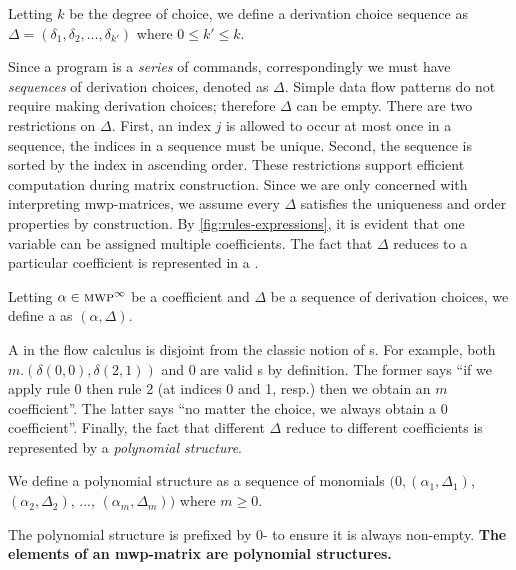 \begin{definition}
    Letting \(k\) be the degree of choice,
    we define a derivation choice sequence as \(\Delta = (\delta_1, \delta_2, \dots, \delta_{k'})\)
    where \(0 \leq k' \leq k \). %
\end{definition}
Since a program is a \emph{series} of commands, correspondingly we must have \emph{sequences} of derivation choices, denoted as \(\Delta\).
Simple data flow patterns do not require making derivation choices;
therefore \(\Delta\) can be empty.
There are two restrictions on \(\Delta\).
First, an index \(j\) is allowed to occur at most once in a sequence, \ie the indices in a sequence must be unique.
Second, the sequence is sorted by the index in ascending order.
These restrictions support efficient computation during matrix construction.
Since we are only concerned with {interpreting} mwp-matrices, we assume every \(\Delta\) satisfies the uniqueness and order properties by construction.
By \autoref{fig:rules-expressions}, it is evident that one variable can be assigned multiple coefficients.
The fact that \(\Delta\) reduces to a particular coefficient is represented in a \emph{}.

\begin{definition}[Monomial]\label{def:mono}
Letting \(\alpha \in \text{\textsc{mwp}}^\infty\) be a coefficient and \(\Delta\) be a sequence of derivation choices,
we define a  as \((\alpha, \Delta)\).
\end{definition}

\noindent
A  in the flow calculus is disjoint from the classic notion of s.
For example, both \(m.(\delta(0,0),\delta(2,1))\) and \(0\) are valid s by definition.
The former says \enquote{if we apply rule 0 then rule 2 (at indices 0 and 1, resp.) then we obtain an \(m\) coefficient}.
The latter says \enquote{no matter the choice, we always obtain a \(0\) coefficient}.
Finally, the fact that {different \(\Delta\)} reduce to {different coefficients} is represented by a \emph{polynomial structure}.

\begin{definition}
    We define a polynomial structure as a sequence of monomials
    \(\big(0,(\alpha_1,\Delta_1)\), \((\alpha_2,\Delta_2)\), \(\dots\), \((\alpha_m, \Delta_m)\big)\) where \(m \geq 0\).
\end{definition}

\noindent The polynomial structure is prefixed by \(0\)- to ensure it is always non-empty.
\textbf{The elements of an mwp-matrix are polynomial structures.}


